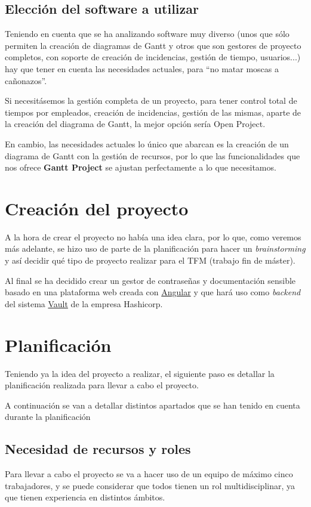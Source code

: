 \documentclass{\ClassPath/viu-tfm-template}
\begin{document}
\section{Elección del software a utilizar}
Teniendo en cuenta que se ha analizando software muy diverso (unos que sólo permiten la creación de diagramas de Gantt y otros que son gestores de proyecto completos, con soporte de creación de incidencias, gestión de tiempo, usuarios...) hay que tener en cuenta las necesidades actuales, para “no matar moscas a cañonazos”.

Si necesitásemos la gestión completa de un proyecto, para tener control total de tiempos por empleados, creación de incidencias, gestión de las mismas, aparte de la creación del diagrama de Gantt, la mejor opción sería Open Project.

En cambio, las necesidades actuales lo único que abarcan es la creación de un diagrama de Gantt con la gestión de recursos, por lo que las funcionalidades que nos ofrece \textbf{Gantt Project} se ajustan perfectamente a lo que necesitamos.


\chapter{Creación del proyecto}
A la hora de crear el proyecto no había una idea clara, por lo que, como veremos más adelante, se hizo uso de parte de la planificación para hacer un \textit{brainstorming} y así decidir qué tipo de proyecto realizar para el TFM (trabajo fin de máster).

Al final se ha decidido crear un gestor de contraseñas y documentación sensible basado en una plataforma web creada con \href{https://angular.io/}{Angular} y que hará uso como \textit{backend} del sistema \href{https://www.vaultproject.io/}{Vault} de la empresa Hashicorp.


\chapter{Planificación}
Teniendo ya la idea del proyecto a realizar, el siguiente paso es detallar la planificación realizada para llevar a cabo el proyecto.

A continuación se van a detallar distintos apartados que se han tenido en cuenta durante la planificación

\section{Necesidad de recursos y roles}
Para llevar a cabo el proyecto se va a hacer uso de un equipo de máximo cinco trabajadores, y se puede considerar que todos tienen un rol multidisciplinar, ya que tienen experiencia en distintos ámbitos.
\end{document}
